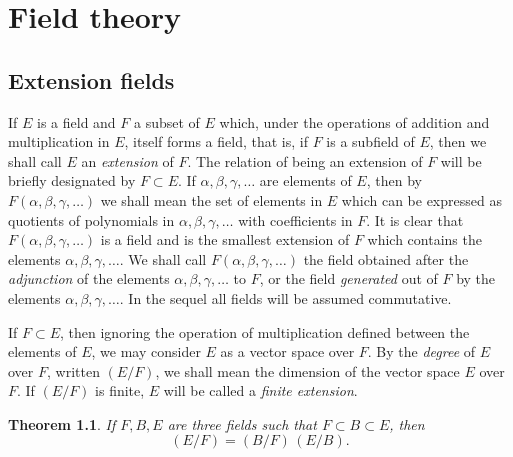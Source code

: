 \documentclass[10pt,leqno,a5paper]{book}
\newtheorem{theo}{Theorem}
\theoremstyle{definition}
\let\hon\chapter
\let\htw\section
\begin{document}
\hon{Field theory}
\thispagestyle{empty}


\htw{Extension fields}

If $E$ is a field and $F$ a subset of $E$ which, under the operations of addition and multiplication in $E$, itself forms a field, that is, if $F$ is a subfield of $E$, then we shall call $E$ an \emph{extension} of $F$.
The relation of being an extension of $F$ will be briefly designated by $F \subset E$.
If $\alpha, \beta, \gamma, \ldots$ are elements of $E$, then by $F(\alpha, \beta, \gamma, \ldots)$ we shall mean the set of elements in $E$ which can be expressed as quotients of polynomials in $\alpha, \beta, \gamma, \ldots$ with coefficients in $F$.
It is clear that $F(\alpha, \beta, \gamma, \ldots)$ is a field and is the smallest extension of $F$ which contains the elements $\alpha, \beta, \gamma, \ldots$.
We shall call $F(\alpha, \beta, \gamma, \ldots)$ the field obtained after the \emph{adjunction} of the elements $\alpha, \beta, \gamma, \ldots$ to $F$, or the field \emph{generated} out of $F$ by the elements $\alpha, \beta, \gamma, \ldots$.
In the sequel all fields will be assumed commutative.

If $F \subset E$, then ignoring the operation of multiplication defined between the elements of $E$, we may consider $E$ as a vector space over $F$.
By the \emph{degree} of $E$ over $F$, written $(E/F)$, we shall mean the dimension of the vector space $E$ over $F$.
If $(E/F)$ is finite, $E$ will be called a \emph{finite extension}.


\begin{theo}
\label{theo:si}
If $F, B, E$ are three fields such that $F \subset B \subset E$, then
\[
(E/F) = (B/F) \, (E/B).
\]
\end{theo}
\end{document}
